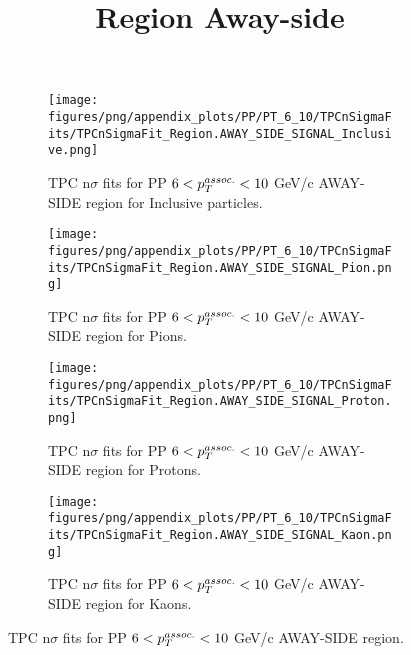             \begin{figure}[H]
                \title{Region Away-side}
                \begin{subfigure}[b]{0.5\textwidth}
                    \centering
                    \texttt{[image: figures/png/appendix\_plots/PP/PT\_6\_10/TPCnSigmaFits/TPCnSigmaFit\_Region.AWAY\_SIDE\_SIGNAL\_Inclusive.png]}
                    \caption{TPC n$\sigma$ fits for PP $6 < \pTassoc < 10$ GeV/c AWAY-SIDE region for Inclusive particles.}
                    \label{fig:appendix_PP_$6 < \pTassoc < 10$ GeV/c_AWAY_SIDE_SIGNAL_Inclusive}
                \end{subfigure}
                \begin{subfigure}[b]{0.5\textwidth}
                    \centering
                    \texttt{[image: figures/png/appendix\_plots/PP/PT\_6\_10/TPCnSigmaFits/TPCnSigmaFit\_Region.AWAY\_SIDE\_SIGNAL\_Pion.png]}
                    \caption{TPC n$\sigma$ fits for PP $6 < \pTassoc < 10$ GeV/c AWAY-SIDE region for Pions.}
                    \label{fig:appendix_PP_$6 < \pTassoc < 10$ GeV/c_AWAY_SIDE_SIGNAL_Pion}
                \end{subfigure}
                \begin{subfigure}[b]{0.5\textwidth}
                    \centering
                    \texttt{[image: figures/png/appendix\_plots/PP/PT\_6\_10/TPCnSigmaFits/TPCnSigmaFit\_Region.AWAY\_SIDE\_SIGNAL\_Proton.png]}
                    \caption{TPC n$\sigma$ fits for PP $6 < \pTassoc < 10$ GeV/c AWAY-SIDE region for Protons.}
                    \label{fig:appendix_PP_$6 < \pTassoc < 10$ GeV/c_AWAY_SIDE_SIGNAL_Proton}
                \end{subfigure}
                \begin{subfigure}[b]{0.5\textwidth}
                    \centering
                    \texttt{[image: figures/png/appendix\_plots/PP/PT\_6\_10/TPCnSigmaFits/TPCnSigmaFit\_Region.AWAY\_SIDE\_SIGNAL\_Kaon.png]}
                    \caption{TPC n$\sigma$ fits for PP $6 < \pTassoc < 10$ GeV/c AWAY-SIDE region for Kaons.}
                    \label{fig:appendix_PP_$6 < \pTassoc < 10$ GeV/c_AWAY_SIDE_SIGNAL_Kaon}
                \end{subfigure}
                \caption{TPC n$\sigma$ fits for PP $6 < \pTassoc < 10$ GeV/c AWAY-SIDE region.}
                \label{fig:appendix_PP_$6 < \pTassoc < 10$ GeV/c_AWAY_SIDE_SIGNAL}
            \end{figure}
